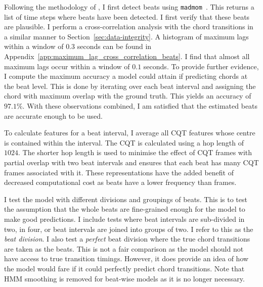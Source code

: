 Following the methodology of \citet{MelodyTranscriptionViaGenerativePreTraining}, I first detect beats using \texttt{madmom}~\citep{madmom}. This returns a list of time steps where beats have been detected. I first verify that these beats are plausible. I perform a cross-correlation analysis with the chord transitions in a similar manner to Section~\ref{sec:data-integrity}. A histogram of maximum lags within a window of $0.3$ seconds can be found in Appendix~\ref{app:maximum_lag_cross_correlation_beats}. I find that almost all maximum lags occur within a window of $0.1$ seconds. To provide further evidence, I compute the maximum accuracy a model could attain if predicting chords at the beat level. This is done by iterating over each beat interval and assigning the chord with maximum overlap with the ground truth. This yields an accuracy of $97.1\%$. With these observations combined, I am satisfied that the estimated beats are accurate enough to be used.

To calculate features for a beat interval, I average all CQT features whose centre is contained within the interval. The CQT is calculated using a hop length of $1024$. The shorter hop length is used to minimise the effect of CQT frames with partial overlap with two beat intervals and ensures that each beat has many CQT frames associated with it. These representations have the added benefit of decreased computational cost as beats have a lower frequency than frames.


I test the model with different divisions and groupings of beats. This is to test the assumption that the whole beats are fine-grained enough for the model to make good predictions. I include tests where beat intervals are sub-divided in two, in four, or beat intervals are joined into groups of two. I refer to this as the \emph{beat division}. I also test a \emph{perfect} beat division where the true chord transitions are taken as the beats. This is not a fair comparison as the model should not have access to true transition timings. However, it does provide an idea of how the model would fare if it could perfectly predict chord transitions. Note that HMM smoothing is removed for beat-wise models as it is no longer necessary.

